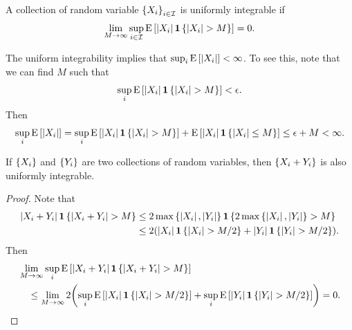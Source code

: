 \begin{definition}
    A collection of random variable $\left\{ {X_i} \right\}_{i\in\mathcal{I}}$ is uniformly integrable if 
    \begin{equation*}
        \lim_{M\to\infty}\sup_{i\in\mathcal{I}}\operatorname{E}\left[ {\left\lvert {X_i} \right\rvert\mathbf{1}\left\{ {\left\lvert {X_i} \right\rvert>M} \right\}} \right] = 0.
    \end{equation*}
\end{definition}
\begin{remark}
    The uniform integrability implies that $\sup_i\operatorname{E}\left[ {\left\lvert {X_i} \right\rvert} \right]<\infty$. 
    To see this, note that we can find $M$ such that 
    \begin{equation*}
        \sup_{i}\operatorname{E}\left[ {\left\lvert {X_i} \right\rvert\mathbf{1}\left\{ {\left\lvert {X_i} \right\rvert>M} \right\}} \right] < \epsilon.
    \end{equation*}
    Then 
    \begin{equation*}
        \sup_{i}\operatorname{E}\left[ {\left\lvert {X_i} \right\rvert} \right] = \sup_i\operatorname{E}\left[ {\left\lvert {X_i} \right\rvert\mathbf{1}\left\{ {\left\lvert {X_i} \right\rvert>M} \right\}} \right] 
        + \operatorname{E}\left[ {\left\lvert {X_i} \right\rvert\mathbf{1}\left\{ {\left\lvert {X_i} \right\rvert\leq M} \right\}} \right] \leq \epsilon + M <\infty. 
    \end{equation*}
\end{remark}

\begin{proposition}\label{prop:unif_int_sum}
    If $\left\{ {X_i} \right\}$ and $\left\{ {Y_i} \right\}$ are two collections of random variables, then 
    $\left\{ {X_i + Y_i} \right\}$ is also uniformly integrable. 
\end{proposition}
\begin{proof}
    Note that 
    \begin{equation*}
        \begin{split}
            \abs{X_i + Y_i}\one\set{\abs{X_i+Y_i}>M} &\leq 2\max\set{\abs{X_i},\abs{Y_i}}\one\set{2\max\set{\abs{X_i},\abs{Y_i}}>M} \\
            &\leq 2\pth{\abs{X_i}\one\set{\abs{X_i}>M/2} + \abs{Y_i}\one\set{\abs{Y_i}>M/2}}.
        \end{split}
    \end{equation*}
    Then 
    \begin{equation*}
        \begin{split}
            &\lim_{M\to\infty}\sup_i\E\sbrc{\abs{X_i + Y_i}\one\set{\abs{X_i+Y_i}>M}} \\
            &\quad\leq  \lim_{M\to\infty}2\pth{\sup_i\E\sbrc{\abs{X_i}\one\set{\abs{X_i}>M/2}} + \sup_i\E\sbrc{\abs{Y_i}\one\set{\abs{Y_i}>M/2}}} 
            = 0. 
        \end{split}
    \end{equation*}
\end{proof}

